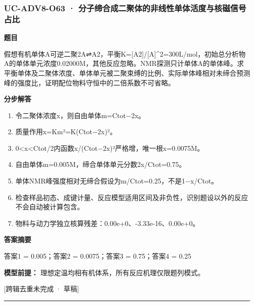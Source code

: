 \documentclass[UTF8,11pt,a4paper]{ctexart}
\begin{document}
\subsubsection*{UC-ADV8-O63 · 分子缔合成二聚体的非线性单体活度与核磁信号占比}
\noindent\textbf{题目}\par
假想有机单体A可逆二聚2A⇌A2，平衡K=[A2]/[A]\textasciicircum{}2=300L/mol，初始总分析物A的单体单元浓度0.02000M，其他反应忽略。NMR探测只计单体A的单体峰。求平衡单体及二聚体浓度、单体单元被二聚束缚的比例、实际单体峰相对未缔合预测峰的强度比，证明配位物料守恒中的二倍系数不可省略。\par
\medskip\noindent\textbf{分步解答}
\begin{enumerate}
\item 令二聚体浓度x，则自由单体m=Ctot−2x。
\item 质量作用x=Km²=K(Ctot−2x)²。
\item 0<x<Ctot/2内函数x/(Ctot−2x)²严格增，唯一根x=0.0075M。
\item 自由单体m=0.005M，缔合单体单元分数2x/Ctot=0.75。
\item 单体NMR峰强度相对无缔合假设为m/Ctot=0.25，不是1−x/Ctot。
\item 检查样品初态、成键计量、反应模型适用区间及非负性，识别题设以外的反应不会自动被计算包含。
\item 物料与动力学独立核算残差：0.00e+0、-3.33e-16、0.00e+0。
\end{enumerate}
\noindent\textbf{答案摘要}\par
答案1 = 0.005；答案2 = 0.0075；答案3 = 0.75；答案4 = 0.25\par
\noindent\textbf{模型前提：}
理想定温均相有机体系，所有反应机理仅限题列模式。\par
\noindent\textcolor{red!65!black}{[跨辑去重未完成 · 草稿]} \par
\medskip\hrule\medskip
{}
\end{document}
